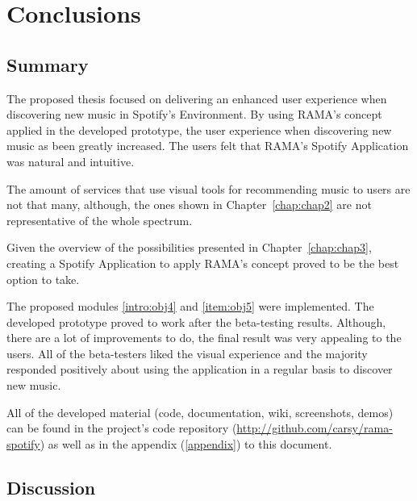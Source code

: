 
\chapter{Conclusions}
\label{chap:chap5}

\section*{}


\section{Summary} %
\label{sec:summary}

  The proposed thesis focused on delivering an enhanced user experience when discovering new music in Spotify's Environment.
  By using RAMA's concept applied in the developed prototype, the user experience when discovering new music as been greatly increased.
  The users felt that RAMA's Spotify Application was natural and intuitive.

  The amount of services that use visual tools for recommending music to users are not that many, although, the ones shown in Chapter~\ref{chap:chap2} are not representative of the whole spectrum.

  Given the overview of the possibilities presented in Chapter~\ref{chap:chap3}, creating a Spotify Application to apply RAMA's concept proved to be the best option to take.

  The proposed modules \ref{intro:obj4} and \ref{item:obj5} were implemented.
  The developed prototype proved to work after the beta-testing results.
  Although, there are a lot of improvements to do, the final result was very appealing to the users.
  All of the beta-testers liked the visual experience and the majority responded positively about using the application in a regular basis to discover new music.

  All of the developed material (code, documentation, wiki, screenshots, demos) can be found in the project's code repository (\url{http://github.com/carsy/rama-spotify}) as well as in the appendix (\ref{appendix}) to this document.


\section{Discussion} %
\label{sec:discussion}

